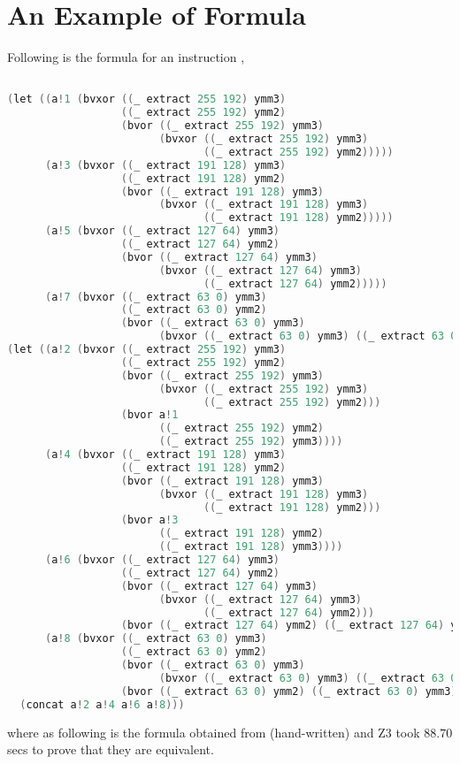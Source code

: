 \section{An Example of \Strata Formula}\label{sec:AP:A}

Following is the \Strata formula for an instruction ,


\begin{lstlisting}[language=C]

(let ((a!1 (bvxor ((_ extract 255 192) ymm3)
                  ((_ extract 255 192) ymm2)
                  (bvor ((_ extract 255 192) ymm3)
                        (bvxor ((_ extract 255 192) ymm3)
                               ((_ extract 255 192) ymm2)))))
      (a!3 (bvxor ((_ extract 191 128) ymm3)
                  ((_ extract 191 128) ymm2)
                  (bvor ((_ extract 191 128) ymm3)
                        (bvxor ((_ extract 191 128) ymm3)
                               ((_ extract 191 128) ymm2)))))
      (a!5 (bvxor ((_ extract 127 64) ymm3)
                  ((_ extract 127 64) ymm2)
                  (bvor ((_ extract 127 64) ymm3)
                        (bvxor ((_ extract 127 64) ymm3)
                               ((_ extract 127 64) ymm2)))))
      (a!7 (bvxor ((_ extract 63 0) ymm3)
                  ((_ extract 63 0) ymm2)
                  (bvor ((_ extract 63 0) ymm3)
                        (bvxor ((_ extract 63 0) ymm3) ((_ extract 63 0) ymm2))))))
(let ((a!2 (bvxor ((_ extract 255 192) ymm3)
                  ((_ extract 255 192) ymm2)
                  (bvor ((_ extract 255 192) ymm3)
                        (bvxor ((_ extract 255 192) ymm3)
                               ((_ extract 255 192) ymm2)))
                  (bvor a!1
                        ((_ extract 255 192) ymm2)
                        ((_ extract 255 192) ymm3))))
      (a!4 (bvxor ((_ extract 191 128) ymm3)
                  ((_ extract 191 128) ymm2)
                  (bvor ((_ extract 191 128) ymm3)
                        (bvxor ((_ extract 191 128) ymm3)
                               ((_ extract 191 128) ymm2)))
                  (bvor a!3
                        ((_ extract 191 128) ymm2)
                        ((_ extract 191 128) ymm3))))
      (a!6 (bvxor ((_ extract 127 64) ymm3)
                  ((_ extract 127 64) ymm2)
                  (bvor ((_ extract 127 64) ymm3)
                        (bvxor ((_ extract 127 64) ymm3)
                               ((_ extract 127 64) ymm2)))
                  (bvor ((_ extract 127 64) ymm2) ((_ extract 127 64) ymm3) a!5)))
      (a!8 (bvxor ((_ extract 63 0) ymm3)
                  ((_ extract 63 0) ymm2)
                  (bvor ((_ extract 63 0) ymm3)
                        (bvxor ((_ extract 63 0) ymm3) ((_ extract 63 0) ymm2)))
                  (bvor ((_ extract 63 0) ymm2) ((_ extract 63 0) ymm3) a!7))))
  (concat a!2 a!4 a!6 a!8)))
\end{lstlisting}

where as following is the formula obtained from \Stoke (hand-written) and 
 Z3 took $88.70$ secs to prove that they are equivalent.

\begin{lstlisting}[language=C]
%ymm1  : (bvxor %ymm2 %ymm3)
\end{lstlisting}